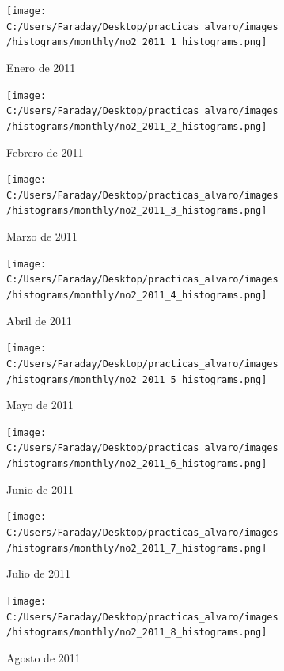 \documentclass[12pt]{article}
\begin{document}
\newpage

\begin{figure}[H]
\centering
\begin{subfigure}[h]{0.45\textwidth}
\texttt{[image: C:/Users/Faraday/Desktop/practicas\_alvaro/images/histograms/monthly/no2\_2011\_1\_histograms.png]}
\caption{Enero de 2011}
\label{fig:hist-mon-1-1-2011}
\end{subfigure}
%
\begin{subfigure}[H]{0.45\textwidth}
\texttt{[image: C:/Users/Faraday/Desktop/practicas\_alvaro/images/histograms/monthly/no2\_2011\_2\_histograms.png]}
\caption{Febrero de 2011}
\label{fig:hist-mon-1-2-2011}
\end{subfigure}
\caption{}
\end{figure}

\begin{figure}[H]
\centering
\begin{subfigure}[h]{0.45\textwidth}
\texttt{[image: C:/Users/Faraday/Desktop/practicas\_alvaro/images/histograms/monthly/no2\_2011\_3\_histograms.png]}
\caption{Marzo de 2011}
\label{fig:hist-mon-1-3-2011}
\end{subfigure}
%
\begin{subfigure}[H]{0.45\textwidth}
\texttt{[image: C:/Users/Faraday/Desktop/practicas\_alvaro/images/histograms/monthly/no2\_2011\_4\_histograms.png]}
\caption{Abril de 2011}
\label{fig:hist-mon-1-4-2011}
\end{subfigure}
\caption{}
\end{figure}

\begin{figure}[H]
\centering
\begin{subfigure}[h]{0.45\textwidth}
\texttt{[image: C:/Users/Faraday/Desktop/practicas\_alvaro/images/histograms/monthly/no2\_2011\_5\_histograms.png]}
\caption{Mayo de 2011}
\label{fig:hist-mon-1-5-2011}
\end{subfigure}
%
\begin{subfigure}[H]{0.45\textwidth}
\texttt{[image: C:/Users/Faraday/Desktop/practicas\_alvaro/images/histograms/monthly/no2\_2011\_6\_histograms.png]}
\caption{Junio de 2011}
\label{fig:hist-mon-1-6-2011}
\end{subfigure}
\caption{}
\end{figure}

\newpage

\begin{figure}[H]
\centering
\begin{subfigure}[h]{0.45\textwidth}
\texttt{[image: C:/Users/Faraday/Desktop/practicas\_alvaro/images/histograms/monthly/no2\_2011\_7\_histograms.png]}
\caption{Julio de 2011}
\label{fig:hist-mon-1-7-2011}
\end{subfigure}
%
\begin{subfigure}[H]{0.45\textwidth}
\texttt{[image: C:/Users/Faraday/Desktop/practicas\_alvaro/images/histograms/monthly/no2\_2011\_8\_histograms.png]}
\caption{Agosto de 2011}
\label{fig:hist-mon-1-8-2011}
\end{subfigure}
\caption{}
\end{figure}
\end{document}
